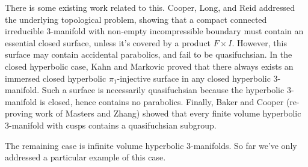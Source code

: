 \documentclass[12pt]{amsart}
\theoremstyle{definition}
\begin{document}
There is some existing work related to this. Cooper, Long, and Reid addressed
the underlying topological problem, showing that a compact connected
irreducible 3-manifold with non-empty incompressible boundary  must contain an
essential closed surface, unless it's covered by a product $F\times I$.
However, this surface may contain accidental parabolics, and fail to be
quasifuchsian.  In the closed hyperbolic case, Kahn and Markovic proved that
there always exists an immersed closed hyperbolic $\pi_1$-injective surface in
any closed hyperbolic 3-manifold. Such a surface is necessarily quasifuchsian
because the hyperbolic 3-manifold is closed, hence contains no parabolics.
Finally, Baker and Cooper (re-proving work of Masters and Zhang) showed that
every finite volume hyperbolic 3-manifold with cusps contains a quasifuchsian
subgroup.

The remaining case is infinite volume hyperbolic 3-manifolds. So far we've only
addressed a particular example of this case.

\end{document}
